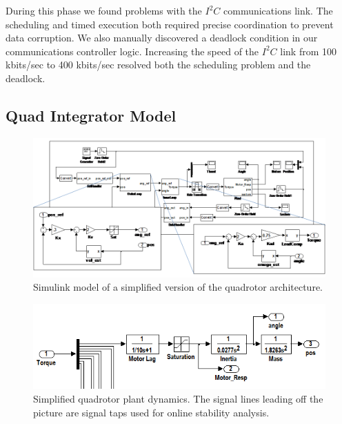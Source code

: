 During this phase we found problems with the $I^2C$ communications link.  The
scheduling and timed execution both required precise coordination to prevent
data corruption.  We also manually discovered a deadlock condition in our 
communications controller logic.  Increasing the speed of the $I^2C$ link from 
100 kbits/sec to 400 kbits/sec resolved both the scheduling problem and the
deadlock.

\subsection{Quad Integrator Model}

\begin{figure}[thb]
\centering
\includegraphics[width=\columnwidth]{figures/quadrotor_mdl.png}
    \caption{Simulink model of a simplified version of 
the quadrotor architecture.}
    \label{fig:qr_mdl}
\end{figure}

\begin{figure}[thb]
\centering
\includegraphics[width=0.8\columnwidth]{figures/quadrotor_plant.png}
    \caption{Simplified quadrotor plant dynamics.  The signal lines leading off the picture are signal taps used for online stability analysis.}
    \label{fig:qr_plant}
\end{figure}

